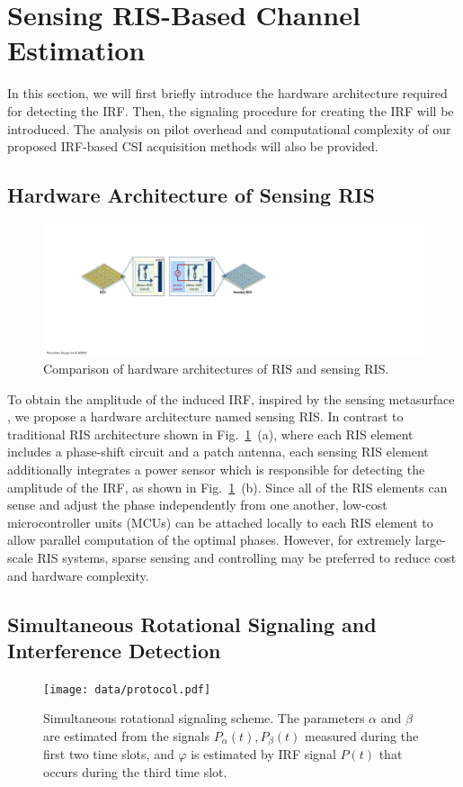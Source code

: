 \documentclass[conference,10pt,twocolumn]{IEEEtran}
\theoremstyle{nonumberplain}
\begin{document}
\section{Sensing RIS-Based Channel Estimation}
\label{Sensing RIS-Based Channel Estimation}
In this section, we will first briefly introduce the hardware architecture required for detecting the \ac{IRF}. 
Then, the signaling procedure for creating the \ac{IRF} will be introduced.
The analysis on pilot overhead and computational complexity of our proposed IRF-based CSI acquisition methods will also be provided.

\subsection{Hardware Architecture of Sensing RIS} \label{Hardware Architecture of Sensing RIS}

    \begin{figure}[!t]
        \centering
        \includegraphics[width=.49\textwidth]{figures/hardware.pdf}
        \caption{Comparison of hardware architectures of RIS and sensing RIS.}
        \label{fig:hardware}
    \end{figure}
    
To obtain the amplitude of the induced \ac{IRF}, inspired by the sensing metasurface \cite{ma2019smart}, we propose a hardware architecture named sensing RIS.
In contrast to traditional RIS architecture shown in Fig.~\ref{fig:hardware}~(a), where each RIS element includes a phase-shift circuit and a patch antenna, each sensing RIS element additionally integrates a power sensor which is responsible for detecting the amplitude of the IRF, as shown in Fig.~\ref{fig:hardware}~(b).
Since all of the RIS elements can sense and adjust the phase independently from one another, low-cost microcontroller units (MCUs) can be attached locally to each RIS element to allow parallel computation of the optimal phases. 
However, for extremely large-scale RIS systems, sparse sensing and controlling may be preferred to reduce cost and hardware complexity. 

\subsection{Simultaneous Rotational Signaling and Interference Detection} \label{Simultaneous Rotational Signaling and Interference Detection}
    \begin{figure}[!t]
        \centering
        \texttt{[image: data/protocol.pdf]}
        \caption{Simultaneous rotational signaling scheme. The parameters $\alpha$ and $\beta$ are estimated from the signals $P_{\alpha}(t), P_{\beta}(t)$ measured during the first two time slots, and $\varphi$ is estimated by IRF signal $P(t)$ that occurs during the third time slot.}
        \label{fig:protocol}
    \end{figure}
\end{document}

